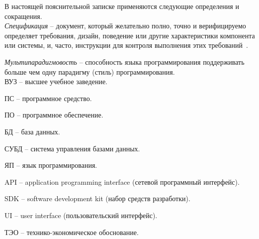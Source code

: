 \label{sec:definitions}

В настоящей пояснительной записке применяются следующие определения и сокращения.
\\

\emph{Спецификация} -- документ, который желательно полно, точно и верифицируемо определяет требования, дизайн, поведение или другие характеристики компонента или системы, и, часто, инструкции для контроля выполнения этих требований~\cite{istqb_specification}.



\emph{Мультипарадигмовость} -- способность языка программирования поддерживать больше чем одну парадигму (стиль) программирования.
\\

ВУЗ -- высшее учебное заведение.

ПС -- программное средство.

ПО -- программное обеспечение.

БД -- база данных.

СУБД -- система управления базами данных.

ЯП -- язык программирования.

API -- application programming interface (сетевой программный интерфейс).

SDK -- software development kit (набор средств разработки).

UI -- user interface (пользовательский интерфейс).

ТЭО -- технико-экономическое обоснование.
